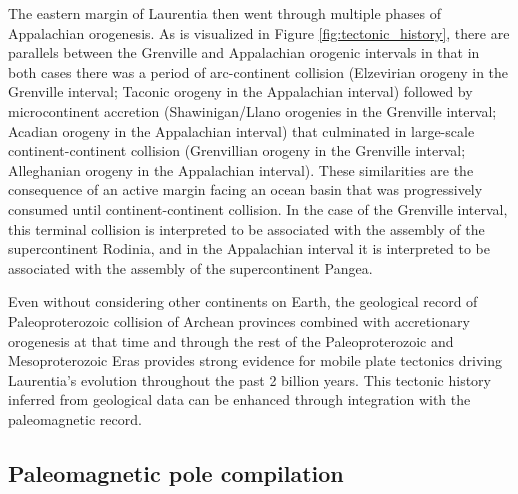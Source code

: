\documentclass[twocolumn, switch]{article} %
\begin{document}
The eastern margin of Laurentia then went through multiple phases of Appalachian orogenesis. As is visualized in Figure \ref{fig:tectonic_history}, there are parallels between the Grenville and Appalachian orogenic intervals in that in both cases there was a period of arc-continent collision (Elzevirian orogeny in the Grenville interval; Taconic orogeny in the Appalachian interval) followed by microcontinent accretion (Shawinigan/Llano orogenies in the Grenville interval; Acadian orogeny in the Appalachian interval) that culminated in large-scale continent-continent collision (Grenvillian orogeny in the Grenville interval; Alleghanian orogeny in the Appalachian interval). These similarities are the consequence of an active margin facing an ocean basin that was progressively consumed until continent-continent collision. In the case of the Grenville interval, this terminal collision is interpreted to be associated with the assembly of the supercontinent Rodinia, and in the Appalachian interval it is interpreted to be associated with the assembly of the supercontinent Pangea.

Even without considering other continents on Earth, the geological record of Paleoproterozoic collision of Archean provinces combined with accretionary orogenesis at that time and through the rest of the Paleoproterozoic and Mesoproterozoic Eras provides strong evidence for mobile plate tectonics driving Laurentia's evolution throughout the past 2 billion years. This tectonic history inferred from geological data can be enhanced through integration with the paleomagnetic record.

\subsection{Paleomagnetic pole compilation}
\end{document}
